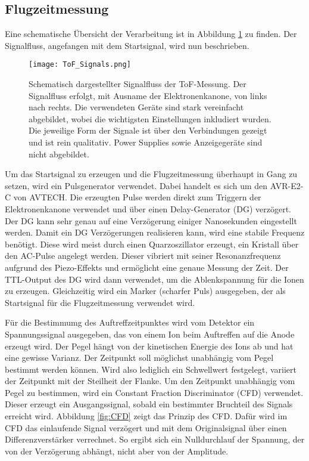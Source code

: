 \subsection{Flugzeitmessung}
Eine schematische Übersicht der Verarbeitung ist in Abbildung \ref{fig:ToF} zu finden. Der Signalfluss, angefangen mit dem Startsignal, wird nun beschrieben.
\begin{figure} 
    \centering
    \texttt{[image: ToF\_Signals.png]}
    \caption[Schematisch dargestellter Signalfluss der ToF-Messung]{Schematisch dargestellter Signalfluss der ToF-Messung. Der Signalfluss erfolgt, mit Ausname der Elektronenkanone, von links nach rechts. Die verwendeten Geräte sind stark vereinfacht abgebildet, wobei die wichtigsten Einstellungen inkludiert wurden. Die jeweilige Form der Signale ist über den Verbindungen gezeigt und ist rein qualitativ. Power Supplies sowie Anzeigegeräte sind nicht abgebildet.}
    \label{fig:ToF} 
\end{figure}
Um das Startsignal zu erzeugen und die Flugzeitmessung überhaupt in Gang zu setzen, wird ein Pulsgenerator verwendet. Dabei handelt es sich um den AVR-E2-C von AVTECH. Die erzeugten Pulse werden direkt zum Triggern der Elektronenkanone verwendet und über einen Delay-Generator (DG) verzögert. Der DG kann sehr genau auf eine Verzögerung einiger Nanosekunden eingestellt werden. Damit ein DG Verzögerungen realisieren kann, wird eine stabile Frequenz benötigt. Diese wird meist durch einen Quarzoszillator erzeugt, ein Kristall über den AC-Pulse angelegt werden. Dieser vibriert mit seiner Resonanzfrequenz aufgrund des Piezo-Effekts und ermöglicht eine genaue Messung der Zeit. Der TTL-Output des DG wird dann verwendet, um die Ablenkspannung für die Ionen zu erzeugen. Gleichzeitig wird ein Marker (scharfer Puls) ausgegeben, der als Startsignal für die Flugzeitmessung verwendet wird.

Für die Bestimmumg des Auftreffzeitpunktes wird vom Detektor ein Spannungssignal ausgegeben, das von einem Ion beim Auftreffen auf die Anode erzeugt wird.  Der Pegel hängt von der kinetischen Energie des Ions ab und hat eine gewisse Varianz. Der Zeitpunkt soll möglichst unabhängig vom Pegel bestimmt werden können. Wird also lediglich ein Schwellwert festgelegt, variiert der Zeitpunkt mit der Steilheit der Flanke. Um den Zeitpunkt unabhängig vom Pegel zu bestimmen, wird ein Constant Fraction Discriminator (CFD) verwendet. Dieser erzeugt ein Ausgangssignal, sobald ein bestimmter Bruchteil des Signals erreicht wird. Abbildung \ref{fig:CFD} zeigt das Prinzip des CFD. Dafür wird im CFD das einlaufende Signal verzögert und mit dem Originalsignal über einen Differenzverstärker verrechnet. So ergibt sich ein Nulldurchlauf der Spannung, der von der Verzögerung abhängt, nicht aber von der Amplitude. 

